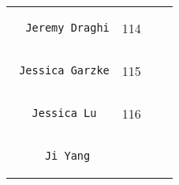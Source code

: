 \documentclass[]{article}
\begin{document}
\begin{longtable}[c]{@{}llll@{}}
\begin{minipage}[t]{0.39\columnwidth}
\begin{verbatim}
  Jeremy Draghi
\end{verbatim}
\end{minipage} & \begin{minipage}[t]{0.10\columnwidth}\raggedright
114
\end{minipage} & \begin{minipage}[t]{0.13\columnwidth}\raggedright
\end{minipage} & \begin{minipage}[t]{0.15\columnwidth}\raggedright
\end{minipage}
\\\noalign{\medskip}
\begin{minipage}[t]{0.39\columnwidth}\raggedright
\begin{verbatim}
 Jessica Garzke
\end{verbatim}
\end{minipage} & \begin{minipage}[t]{0.10\columnwidth}\raggedright
115
\end{minipage} & \begin{minipage}[t]{0.13\columnwidth}\raggedright
\end{minipage} & \begin{minipage}[t]{0.15\columnwidth}\raggedright
\end{minipage}
\\\noalign{\medskip}
\begin{minipage}[t]{0.39\columnwidth}\raggedright
\begin{verbatim}
   Jessica Lu
\end{verbatim}
\end{minipage} & \begin{minipage}[t]{0.10\columnwidth}\raggedright
116
\end{minipage} & \begin{minipage}[t]{0.13\columnwidth}\raggedright
\end{minipage} & \begin{minipage}[t]{0.15\columnwidth}\raggedright
\end{minipage}
\\\noalign{\medskip}
\begin{minipage}[t]{0.39\columnwidth}\raggedright
\begin{verbatim}
     Ji Yang
\end{verbatim}
\end{minipage} & \begin{minipage}[t]{0.10\columnwidth}\raggedright

\end{minipage}
\end{longtable}
\end{document}

